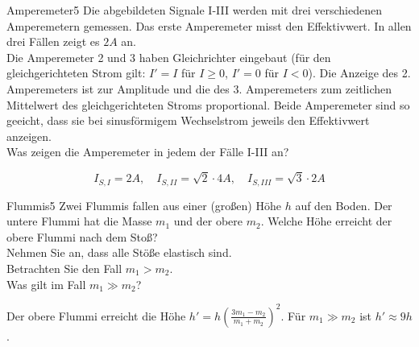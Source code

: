 \begin{problem}{Amperemeter}{5}
Die abgebildeten Signale I-III werden mit drei verschiedenen Amperemetern gemessen.
Das erste Amperemeter misst den Effektivwert. In allen drei Fällen zeigt es $2\unit{A}$ an.\\
Die Amperemeter 2 und 3 haben Gleichrichter eingebaut (für den gleichgerichteten Strom gilt: $I'=I$ für $I \geq 0$, $I' = 0$ für $I < 0$). Die Anzeige des 2. Amperemeters ist zur Amplitude und die des 3. Amperemeters zum zeitlichen Mittelwert des gleichgerichteten Stroms proportional. Beide Amperemeter sind so geeicht, dass sie bei sinusförmigem Wechselstrom jeweils den Effektivwert anzeigen.\\
Was zeigen die Amperemeter in jedem der Fälle I-III an?
\begin{solution}
\[
I_{S,I}=2\unit{A},\quad I_{S,II}=\sqrt{2}\cdot 4\unit{A},\quad I_{S,III}=\sqrt{3}\cdot 2\unit{A}
\]
\end{solution}
\end{problem}


\begin{problem}{Flummis}{5}
Zwei Flummis fallen aus einer (großen) Höhe $h$ auf den Boden. Der untere Flummi hat die Masse $m_1$ und der obere $m_2$. Welche Höhe erreicht der obere Flummi nach dem Stoß?\\
Nehmen Sie an, dass alle Stöße elastisch sind.\\
Betrachten Sie den Fall $m_1 > m_2$.\\
Was gilt im Fall $m_1 \gg m_2$?
\begin{solution}
Der obere Flummi erreicht die Höhe $h'=h\left(\frac{3m_1-m_2}{m_1+m_2}\right)^2$. Für $m_1\gg m_2$ ist $h' \approx 9h$.
\end{solution}
\end{problem}


